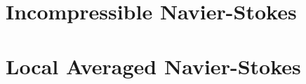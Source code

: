 \documentclass{report}
\newcommand{\dy}[1]{\frac{\partial #1}{\partial y}}
\newcommand{\dz}[1]{\frac{\partial #1}{\partial z}}
\begin{document}
%

\section{Incompressible Navier-Stokes}
\section{Local Averaged Navier-Stokes}
\end{document}
